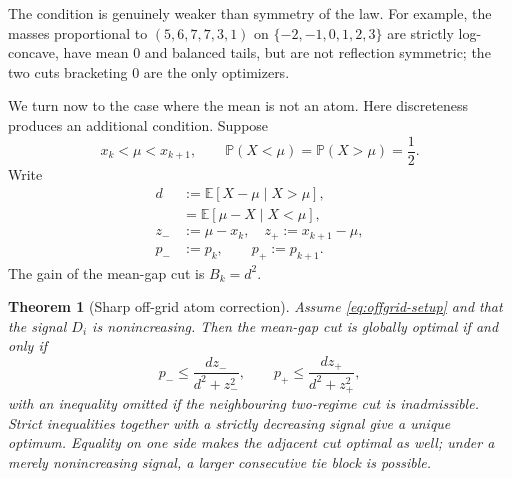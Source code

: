 \documentclass[a4paper]{amsart}
\numberwithin{equation}{section}
\newtheorem{theorem}{Theorem}[section]
\theoremstyle{remark}
\newcommand{\E}{\mathbb E}
\newcommand{\Pp}{\mathbb P}
\newcommand{\1}{\mathbf 1}
\begin{document}
The condition is genuinely weaker than symmetry of the law.  For example,
the masses proportional to $(5,6,7,7,3,1)$ on
$\{-2,-1,0,1,2,3\}$ are strictly log-concave, have mean $0$ and balanced
tails, but are not reflection symmetric; the two cuts bracketing $0$ are the
only optimizers.

We turn now to the case where the mean is not an atom.  Here discreteness
produces an additional condition.  Suppose
\begin{equation}\label{eq:offgrid-setup}
 x_k<\mu<x_{k+1},\qquad
 \Pp(X<\mu)=\Pp(X>\mu)=\frac12.
\end{equation}
Write
\begin{align*}
 d&:=\E[X-\mu\mid X>\mu],\\
  &=\E[\mu-X\mid X<\mu],\\
 z_-&:=\mu-x_k,\quad z_+:=x_{k+1}-\mu,\\
 p_-&:=p_k,\qquad p_+:=p_{k+1}.
\end{align*}
The gain of the mean-gap cut is $B_k=d^2$.

\begin{theorem}[Sharp off-grid atom correction]
\label{thm:offgrid-correction}
Assume \eqref{eq:offgrid-setup} and that the signal $D_i$ is nonincreasing.
Then the mean-gap cut is globally optimal if and only if
\begin{equation}\label{eq:boundary-atom-condition}
 p_-\leq\frac{dz_-}{d^2+z_-^2},\qquad
 p_+\leq\frac{dz_+}{d^2+z_+^2},
\end{equation}
with an inequality omitted if the neighbouring two-regime cut is
inadmissible.  Strict inequalities together with a strictly decreasing
signal give a unique optimum.  Equality on one side makes the adjacent cut
optimal as well; under a merely nonincreasing signal, a larger consecutive
tie block is possible.
\end{theorem}
\end{document}

